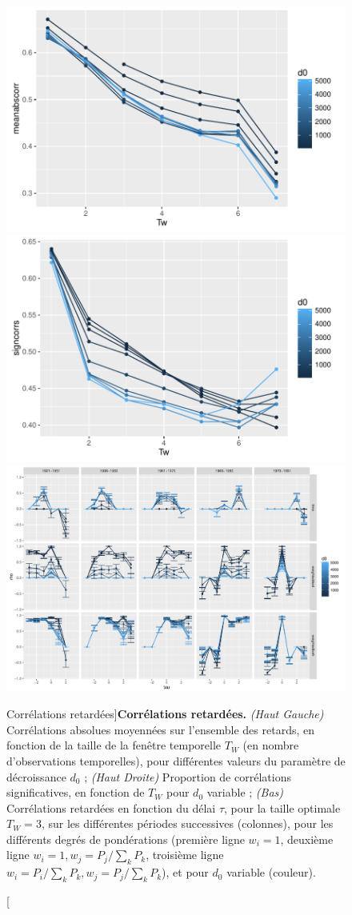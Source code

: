 \begin{figure}[h!]
\includegraphics[width=0.49\linewidth]{Figures/CausalityRegimes/meanabscorrs}
\includegraphics[width=0.49\linewidth]{Figures/CausalityRegimes/significantcorrs}\\
\includegraphics[width=\linewidth]{Figures/CausalityRegimes/laggedCorrs_Tw3}
\caption[Lagged correlations][Corrélations retardées]{\label{fig:causalityregimes:sudafcorrs}}{\textbf{Corrélations retardées.} \textit{(Haut Gauche)} Corrélations absolues moyennées sur l'ensemble des retards, en fonction de la taille de la fenêtre temporelle $T_W$ (en nombre d'observations temporelles), pour différentes valeurs du paramètre de décroissance $d_0$ ; \textit{(Haut Droite)} Proportion de corrélations significatives, en fonction de $T_W$ pour $d_0$ variable ; \textit{(Bas)} Corrélations retardées en fonction du délai $\tau$, pour la taille optimale $T_W=3$, sur les différentes périodes successives (colonnes), pour les différents degrés de pondérations (première ligne $w_i=1$, deuxième ligne $w_i = 1,w_j=P_j/\sum_k P_k$, troisième ligne $w_i = P_i/\sum_k P_k,w_j=P_j/\sum_k P_k$), et pour $d_0$ variable (couleur).\label{fig:causalityregimes:sudafcorrs}}
\end{figure}


